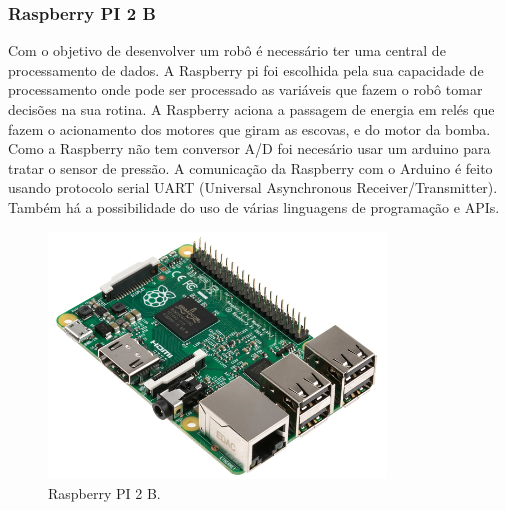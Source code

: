 \subsubsection{Raspberry PI 2 B}
Com o objetivo de desenvolver um robô é necessário ter uma central de processamento de dados. A Raspberry pi foi escolhida pela sua capacidade de processamento onde pode ser processado as variáveis que fazem o robô tomar decisões na sua rotina. A Raspberry aciona a passagem de energia em  relés que fazem o acionamento dos motores que giram as escovas, e do motor da bomba. Como a Raspberry não tem conversor A/D foi necesário usar um arduino para tratar o sensor de pressão. A comunicação da Raspberry com o Arduino é feito usando protocolo serial  UART (Universal Asynchronous Receiver/Transmitter). Também há a possibilidade do uso de várias linguagens de programação e APIs.
\par
\begin{figure}[h]
  \centering
  \includegraphics[width=0.8\textwidth]{figures/rpi2b.jpg}
  \caption{Raspberry PI 2 B.}
  \label{fig:schema-eletro-soft}
\end{figure}
\FloatBarrier
\par

